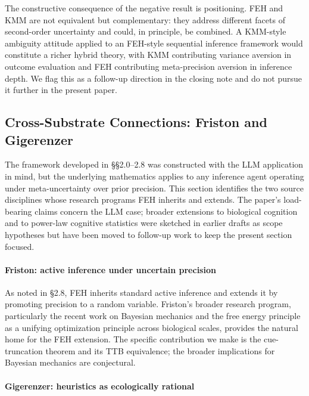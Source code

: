 \documentclass{article}
\begin{document}
The constructive consequence of the negative result is positioning. FEH
and KMM are not equivalent but complementary: they address different
facets of second-order uncertainty and could, in principle, be combined.
A KMM-style ambiguity attitude applied to an FEH-style sequential
inference framework would constitute a richer hybrid theory, with KMM
contributing variance aversion in outcome evaluation and FEH
contributing meta-precision aversion in inference depth. We flag this as
a follow-up direction in the closing note and do not pursue it further
in the present paper.

\subsection{Cross-Substrate Connections: Friston and
Gigerenzer}\label{cross-substrate-connections-friston-and-gigerenzer}

The framework developed in \S{}\S{}2.0--2.8 was constructed with the LLM
application in mind, but the underlying mathematics applies to any
inference agent operating under meta-uncertainty over prior precision.
This section identifies the two source disciplines whose research
programs FEH inherits and extends. The paper's load-bearing claims
concern the LLM case; broader extensions to biological cognition and to
power-law cognitive statistics were sketched in earlier drafts as scope
hypotheses but have been moved to follow-up work to keep the present
section focused.

\paragraph{Friston: active inference under uncertain
precision}\label{friston-active-inference-under-uncertain-precision}

As noted in \S{}2.8, FEH inherits standard active inference and extends it
by promoting precision to a random variable. Friston's broader research
program, particularly the recent work on Bayesian mechanics and the free
energy principle as a unifying optimization principle across biological
scales, provides the natural home for the FEH extension. The specific
contribution we make is the cue-truncation theorem and its TTB
equivalence; the broader implications for Bayesian mechanics are
conjectural.

\paragraph{Gigerenzer: heuristics as ecologically
rational}\label{gigerenzer-heuristics-as-ecologically-rational}
\end{document}
